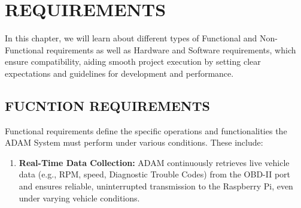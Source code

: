 \chapter{REQUIREMENTS}
\justify
In this chapter, we will learn about different types of Functional and Non-Functional requirements as well as Hardware and Software requirements, which ensure compatibility, aiding smooth project execution by setting clear expectations and guidelines for development and performance.
\section{FUCNTION REQUIREMENTS}
Functional requirements define the specific operations and functionalities the ADAM System must perform under various conditions. These include:

\begin{enumerate}
    \item \textbf{Real-Time Data Collection:}
    ADAM continuously retrieves live vehicle data (e.g., RPM, speed, Diagnostic Trouble Codes) from the OBD-II port and ensures reliable, uninterrupted transmission to the Raspberry Pi, even under varying vehicle conditions.


\end{enumerate}
